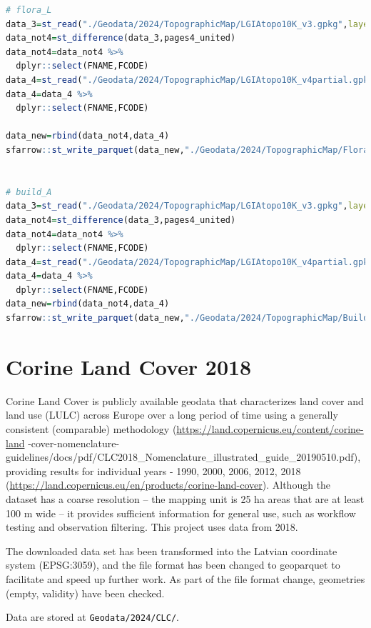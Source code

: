 \documentclass[
]{book}
\newcommand{\passthrough}[1]{#1}
\begin{document}
\begin{lstlisting}[language=R]
# flora_L
data_3=st_read("./Geodata/2024/TopographicMap/LGIAtopo10K_v3.gpkg",layer="flora_L")
data_not4=st_difference(data_3,pages4_united)
data_not4=data_not4 %>% 
  dplyr::select(FNAME,FCODE)
data_4=st_read("./Geodata/2024/TopographicMap/LGIAtopo10K_v4partial.gpkg",layer="flora_L")
data_4=data_4 %>% 
  dplyr::select(FNAME,FCODE)

data_new=rbind(data_not4,data_4)
sfarrow::st_write_parquet(data_new,"./Geodata/2024/TopographicMap/FloraL_COMB.parquet")


# build_A
data_3=st_read("./Geodata/2024/TopographicMap/LGIAtopo10K_v3.gpkg",layer="build_A")
data_not4=st_difference(data_3,pages4_united)
data_not4=data_not4 %>% 
  dplyr::select(FNAME,FCODE)
data_4=st_read("./Geodata/2024/TopographicMap/LGIAtopo10K_v4partial.gpkg",layer="build_A")
data_4=data_4 %>% 
  dplyr::select(FNAME,FCODE)
data_new=rbind(data_not4,data_4)
sfarrow::st_write_parquet(data_new,"./Geodata/2024/TopographicMap/BuildA_COMB.parquet")
\end{lstlisting}

\section{Corine Land Cover 2018}\label{Ch04.05}

Corine Land Cover is publicly available geodata that characterizes land cover
and land use (LULC) across Europe over a long period of time using a generally
consistent (comparable) methodology (\url{https://land.copernicus.eu/content/corine-land} -cover-nomenclature-guidelines/docs/pdf/CLC2018\_Nomenclature\_illustrated\_guide\_20190510.pdf),
providing results for individual years - 1990, 2000, 2006, 2012,
2018 (\url{https://land.copernicus.eu/en/products/corine-land-cover}).
Although the dataset has a coarse resolution -- the mapping unit is 25 ha areas
that are at least 100 m wide -- it provides sufficient information for general
use, such as workflow testing and observation filtering. This project uses
data from 2018.

The downloaded data set has been transformed into the Latvian coordinate
system (EPSG:3059), and the file format has been changed to geoparquet to
facilitate and speed up further work. As part of the file format change,
geometries (empty, validity) have been checked.

Data are stored at \passthrough{\lstinline!Geodata/2024/CLC/!}.
\end{document}
